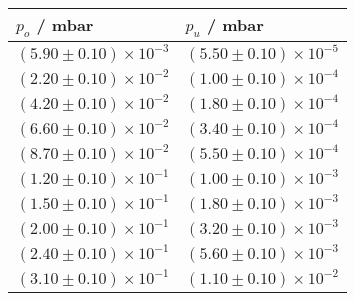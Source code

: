 \begin{tabular}{ll}
\toprule
                                $p_o$ / mbar &                                 $p_u$ / mbar \\
\midrule
 $\left(5.90 \pm 0.10\right) \times 10^{-3}$ &  $\left(5.50 \pm 0.10\right) \times 10^{-5}$ \\
 $\left(2.20 \pm 0.10\right) \times 10^{-2}$ &  $\left(1.00 \pm 0.10\right) \times 10^{-4}$ \\
 $\left(4.20 \pm 0.10\right) \times 10^{-2}$ &  $\left(1.80 \pm 0.10\right) \times 10^{-4}$ \\
 $\left(6.60 \pm 0.10\right) \times 10^{-2}$ &  $\left(3.40 \pm 0.10\right) \times 10^{-4}$ \\
 $\left(8.70 \pm 0.10\right) \times 10^{-2}$ &  $\left(5.50 \pm 0.10\right) \times 10^{-4}$ \\
 $\left(1.20 \pm 0.10\right) \times 10^{-1}$ &  $\left(1.00 \pm 0.10\right) \times 10^{-3}$ \\
 $\left(1.50 \pm 0.10\right) \times 10^{-1}$ &  $\left(1.80 \pm 0.10\right) \times 10^{-3}$ \\
 $\left(2.00 \pm 0.10\right) \times 10^{-1}$ &  $\left(3.20 \pm 0.10\right) \times 10^{-3}$ \\
 $\left(2.40 \pm 0.10\right) \times 10^{-1}$ &  $\left(5.60 \pm 0.10\right) \times 10^{-3}$ \\
 $\left(3.10 \pm 0.10\right) \times 10^{-1}$ &  $\left(1.10 \pm 0.10\right) \times 10^{-2}$ \\
\bottomrule
\end{tabular}
